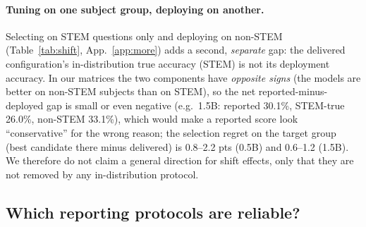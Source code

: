 \paragraph{Tuning on one subject group, deploying on another.}
Selecting on STEM questions only and deploying on non-STEM (Table~\ref{tab:shift}, App.~\ref{app:more}) adds a second, \emph{separate} gap: the delivered configuration's in-distribution true accuracy (STEM) is not its deployment accuracy.
In our matrices the two components have \emph{opposite signs} (the models are better on non-STEM subjects than on STEM), so the net reported-minus-deployed gap is small or even negative (e.g.\ 1.5B: reported 30.1\%, STEM-true 26.0\%, non-STEM 33.1\%), which would make a reported score look ``conservative'' for the wrong reason; the selection regret on the target group (best candidate there minus delivered) is 0.8--2.2 pts (0.5B) and 0.6--1.2 (1.5B).
We therefore do not claim a general direction for shift effects, only that they are not removed by any in-distribution protocol.


\subsection{Which reporting protocols are reliable?}\label{sec:protocols_results}

